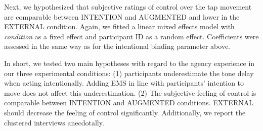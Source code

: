 Next, we hypothesized that subjective ratings of control over the tap movement are comparable between INTENTION and AUGMENTED and lower in the EXTERNAL condition. Again, we fitted a linear mixed effects model with \textit{condition} as a fixed effect and participant ID as a random effect. Coefficients were assessed in the same way as for the intentional binding parameter above.

In short, we tested two main hypotheses with regard to the agency experience in our three experimental conditions: (1) participants underestimate the tone delay when acting intentionally. Adding EMS in line with participants' intention to move does not affect this underestimation. (2) The subjective feeling of control is comparable between INTENTION and AUGMENTED conditions. EXTERNAL should decrease the feeling of control significantly. Additionally, we report the clustered interviews anecdotally.


